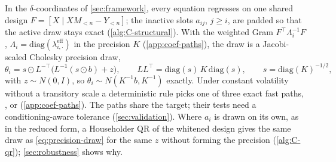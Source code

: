 In the $\delta$-coordinates of \cref{sec:framework}, every equation regresses on one shared
design $F = [X \mid XM_{<n} - Y_{<n}]$; the inactive slots $a_{ij}$, $j \ge i$, are padded so that
the active draw stays exact (\cref{alg:C-structural}). %
With the weighted Gram $F^\top\Lambda_i^{-1}F$, $\Lambda_i = \mathrm{diag}(\lambda^{\mathrm{eff}}_{i,\cdot})$
in the precision $K$ (\cref{app:coef-paths}), the draw is a Jacobi-scaled Cholesky precision draw, %
\begin{equation}\label{eq:precision-draw}
  \theta_i = s \odot L^{-\top}\bigl(L^{-1}(s \odot b) + z\bigr), \qquad
  LL^\top = \mathrm{diag}(s)\,K\,\mathrm{diag}(s), \qquad s = \mathrm{diag}(K)^{-1/2},
\end{equation}
with $z \sim N(0, I)$, so $\theta_i \sim N(K^{-1}b, K^{-1})$ exactly. %
Under constant volatility without a transitory scale a deterministic rule picks one of three exact
fast paths, ,  or  (\cref{app:coef-paths}). %
The paths share the target; their tests need a conditioning-aware tolerance
(\cref{sec:validation}). %
Where $a_i$ is drawn on its own, as in the reduced form, a Householder QR of the whitened design
gives the same draw as \eqref{eq:precision-draw} for the same $z$ without forming the precision
(\cref{alg:C-qr});
\cref{sec:robustness} shows why. %

